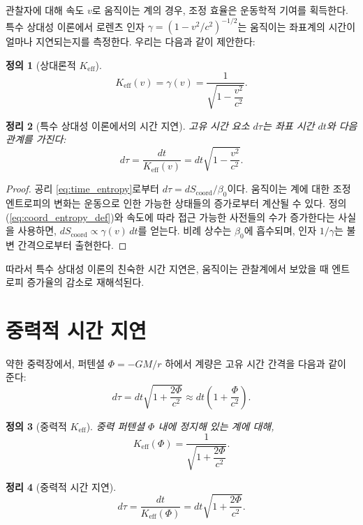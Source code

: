 \documentclass[12pt,a4paper]{article}
\newtheorem{theorem}{정리}[section]
\newtheorem{definition}[theorem]{정의}
\newcommand{\Keff}{K_{\mathrm{eff}}}
\newcommand{\Scoord}{S_{\mathrm{coord}}}
\begin{document}
	관찰자에 대해 속도 \(v\)로 움직이는 계의 경우, 조정 효율은 운동학적 기여를 획득한다. 특수 상대성 이론에서 로렌츠 인자 \(\gamma = (1-v^2/c^2)^{-1/2}\)는 움직이는 좌표계의 시간이 얼마나 지연되는지를 측정한다. 우리는 다음과 같이 제안한다:
	\begin{definition}[상대론적 \(\Keff\)]
		\[
		\Keff(v) = \gamma(v) = \frac{1}{\sqrt{1-\dfrac{v^2}{c^2}}}.
		\]
	\end{definition}
	
	\begin{theorem}[특수 상대성 이론에서의 시간 지연]
		고유 시간 요소 \(d\tau\)는 좌표 시간 \(dt\)와 다음 관계를 가진다:
		\begin{equation}
			d\tau = \frac{dt}{\Keff(v)} = dt\sqrt{1-\frac{v^2}{c^2}}.
		\end{equation}
	\end{theorem}
	
	\begin{proof}
		공리 \ref{eq:time_entropy}로부터 \(d\tau = d\Scoord/\beta_0\)이다. 움직이는 계에 대한 조정 엔트로피의 변화는 운동으로 인한 가능한 상태들의 증가로부터 계산될 수 있다. 정의 (\ref{eq:coord_entropy_def})와 속도에 따라 접근 가능한 사전들의 수가 증가한다는 사실을 사용하면, \(d\Scoord \propto \gamma(v)\, dt\)를 얻는다. 비례 상수는 \(\beta_0\)에 흡수되며, 인자 \(1/\gamma\)는 불변 간격으로부터 출현한다.
	\end{proof}
	
	따라서 특수 상대성 이론의 친숙한 시간 지연은, 움직이는 관찰계에서 보았을 때 엔트로피 증가율의 감소로 재해석된다.
	
	\section{중력적 시간 지연}
	\label{sec:gr}
	
	약한 중력장에서, 퍼텐셜 \(\Phi = -GM/r\) 하에서 계량은 고유 시간 간격을 다음과 같이 준다:
	\begin{equation}
		d\tau = dt\sqrt{1 + \frac{2\Phi}{c^2}} \approx dt\left(1 + \frac{\Phi}{c^2}\right).
	\end{equation}
	
	\begin{definition}[중력적 \(\Keff\)]
		중력 퍼텐셜 \(\Phi\) 내에 정지해 있는 계에 대해,
		\[
		\Keff(\Phi) = \frac{1}{\sqrt{1 + \dfrac{2\Phi}{c^2}}}.
		\]
	\end{definition}
	
	\begin{theorem}[중력적 시간 지연]
		\begin{equation}
			d\tau = \frac{dt}{\Keff(\Phi)} = dt\sqrt{1 + \frac{2\Phi}{c^2}}.
		\end{equation}
	\end{theorem}
	
\end{document}
